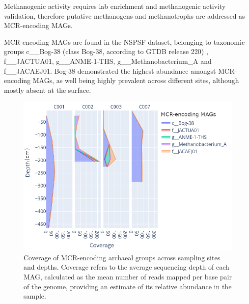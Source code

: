 \footnotesize
\begin{multicols}{2}[\columnsep=0.4cm]
    Methanogenic activity requires lab enrichment and methanogenic activity validation, therefore putative methanogens and methanotrophs are addressed as MCR-encoding MAGs.

    \vspace{0.2cm}
    
    MCR-encoding MAGs are found in the NSPSF dataset, belonging to taxonomic groups c\_\_Bog-38 (class Bog-38, according to GTDB release 220) \cite{Chaumeil_2022_gtdbtk}, f\_\_JACTUA01, g\_\_ANME-1-THS, g\_\_Methanobacterium\_A and f\_\_JACAEJ01. Bog-38 demonstrated the highest abundance amongst MCR-encoding MAGs, as well being highly prevalent across different sites, although mostly absent at the surface.

    \begin{figure}[H]
        \vspace{-0.4cm}
        \centering
        \includegraphics[width=\linewidth]{content-images/abundance_depth.png}
        \caption{\scriptsize Coverage of MCR-encoding archaeal groups across sampling sites and depths. Coverage refers to the average sequencing depth of each MAG, calculated as the mean number of reads mapped per base pair of the genome, providing an estimate of its relative abundance in the sample.}
        \label{fig:coverage}
    \end{figure}  

    \vspace{-0.4cm}
    

\end{multicols}
